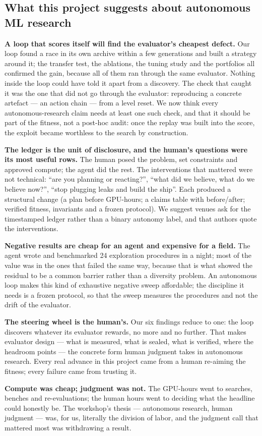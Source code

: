 \subsection*{What this project suggests about autonomous ML research}
\textbf{A loop that scores itself will find the evaluator's cheapest defect.} Our loop found a race in its own archive within a few
generations and built a strategy around it; the transfer test, the ablations, the tuning study and the portfolios all confirmed the gain,
because all of them ran through the same evaluator. Nothing inside the loop could have told it apart from a discovery. The check that
caught it was the one that did not go through the evaluator: reproducing a concrete artefact --- an action chain --- from a level reset.
We now think every autonomous-research claim needs at least one such check, and that it should be part of the fitness, not a
post-hoc audit: once the replay was built into the score, the exploit became worthless to the search by construction.

\textbf{The ledger is the unit of disclosure, and the human's questions were its most useful rows.} The human posed the problem, set
constraints and approved compute; the agent did the rest. The interventions that mattered were not technical: ``are you planning or
reacting?'', ``what did we believe, what do we believe now?'', ``stop plugging leaks and build the ship''. Each produced a
structural change (a plan before GPU-hours; a claims table with before/after; verified fitness, invariants and a frozen protocol).
We suggest venues ask for the timestamped ledger rather than a binary autonomy label, and that authors quote the interventions.

\textbf{Negative results are cheap for an agent and expensive for a field.} The agent wrote and benchmarked 24 exploration
procedures in a night; most of the value was in the ones that failed the same way, because that is what showed the residual to be a
common barrier rather than a diversity problem. An autonomous loop makes this kind of exhaustive negative sweep affordable; the
discipline it needs is a frozen protocol, so that the sweep measures the procedures and not the drift of the evaluator.

\textbf{The steering wheel is the human's.} Our six findings reduce to one: the loop discovers whatever its evaluator rewards, no more and no further. That makes evaluator design --- what is measured, what is sealed, what is verified, where the headroom points --- the concrete form human judgment takes in autonomous research. Every real advance in this project came from a human re-aiming the fitness; every failure came from trusting it.

\textbf{Compute was cheap; judgment was not.} The GPU-hours went to searches, benches and re-evaluations; the human hours went to
deciding what the headline could honestly be. The workshop's thesis --- autonomous research, human judgment --- was, for us,
literally the division of labor, and the judgment call that mattered most was withdrawing a result.
